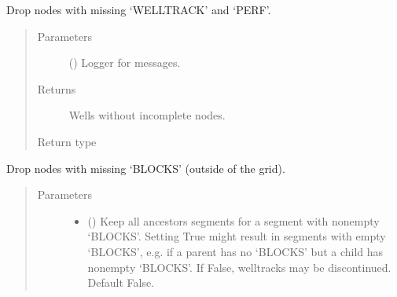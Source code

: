 \documentclass[letterpaper,10pt,english]{sphinxmanual}
\begin{document}
\begin{fulllineitems}
\begin{fulllineitems}
\end{fulllineitems}


\begin{fulllineitems}
\label{\detokenize{api/wells:geology.src.wells.Wells.drop_incomplete}}
Drop nodes with missing ‘WELLTRACK’ and ‘PERF’.
\begin{quote}\begin{description}
\item[{Parameters}] \leavevmode
{} (\sphinxstyleliteralemphasis{\sphinxupquote{, }}) \textendash{} Logger for messages.

\item[{Returns}] \leavevmode
{} \textendash{} Wells without incomplete nodes.

\item[{Return type}] \leavevmode
{\hyperref[\detokenize{api/wells:geology.src.wells.Wells}]{}}

\end{description}\end{quote}

\end{fulllineitems}


\begin{fulllineitems}
\label{\detokenize{api/wells:geology.src.wells.Wells.drop_outside}}
Drop nodes with missing ‘BLOCKS’ (outside of the grid).
\begin{quote}\begin{description}
\item[{Parameters}] \leavevmode\begin{itemize}
\item {} 
 () \textendash{} Keep all ancestors segments for a segment with nonempty ‘BLOCKS’. Setting True might result
in segments with empty ‘BLOCKS’, e.g. if a parent has no ‘BLOCKS’ but a child has nonempty
‘BLOCKS’. If False, welltracks may be discontinued. Default False.


\end{itemize}
\end{description}
\end{quote}
\end{fulllineitems}
\end{fulllineitems}
\end{document}
